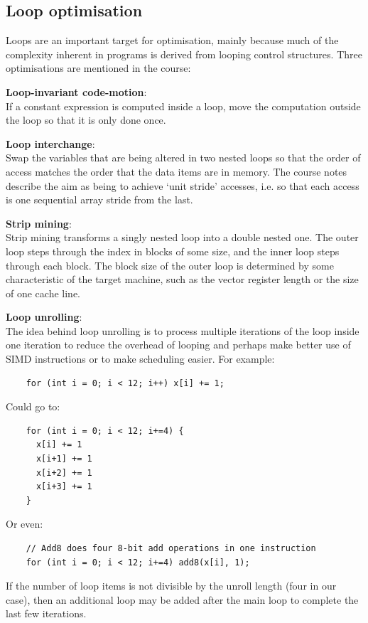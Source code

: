 \subsection{Loop optimisation}

Loops are an important target for optimisation, mainly because much of
the complexity inherent in programs is derived from looping control
structures. Three optimisations are mentioned in the course:

\begin{description}
  \item \textbf{Loop-invariant code-motion}:\\ If a constant
    expression is computed inside a loop, move the computation outside
    the loop so that it is only done once.
    
  \item \textbf{Loop interchange}:\\ Swap the variables that are being
  altered in two nested loops so that the order of access matches the
  order that the data items are in memory. The course notes describe
  the aim as being to achieve `unit stride' accesses, i.e. so that
  each access is one sequential array stride from the last.

  \item \textbf{Strip mining}:\\ Strip mining transforms a singly
  nested loop into a double nested one. The outer loop steps through
  the index in blocks of some size, and the inner loop steps through
  each block. The block size of the outer loop is determined by some
  characteristic of the target machine, such as the vector register
  length or the size of one cache line.

  \item \textbf{Loop unrolling}:\\ The idea behind loop unrolling is
  to process multiple iterations of the loop inside one iteration to
  reduce the overhead of looping and perhaps make better use of SIMD
  instructions or to make scheduling easier. For example:
  
  \begin{verbatim}
    for (int i = 0; i < 12; i++) x[i] += 1;
  \end{verbatim}

  Could go to:

  \begin{verbatim}
    for (int i = 0; i < 12; i+=4) {
      x[i] += 1
      x[i+1] += 1
      x[i+2] += 1
      x[i+3] += 1
    }
  \end{verbatim}

  Or even:

  \begin{verbatim}
    // Add8 does four 8-bit add operations in one instruction
    for (int i = 0; i < 12; i+=4) add8(x[i], 1);
  \end{verbatim}

  If the number of loop items is not divisible by the unroll length
  (four in our case), then an additional loop may be added after the
  main loop to complete the last few iterations.
\end{description}


